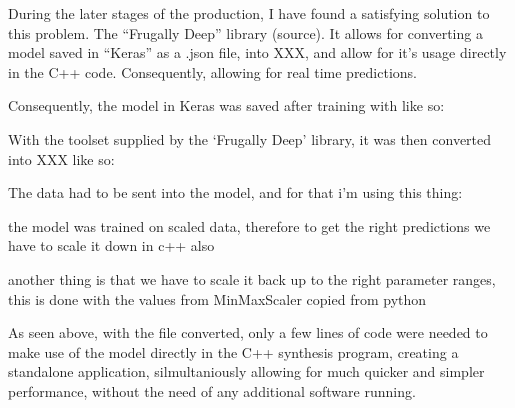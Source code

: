 During the later stages of the production, I have found a satisfying
solution to this problem. The ``Frugally Deep'' library (source). It
allows for converting a model saved in ``Keras'' as a .json file, into
XXX, and allow for it's usage directly in the C++ code. Consequently,
allowing for real time predictions.

Consequently, the model in Keras was saved after training with like so:

With the toolset supplied by the `Frugally Deep' library, it was then
converted into XXX like so:

The data had to be sent into the model, and for that i'm using this thing:

the model was trained on scaled data, therefore to get the right
predictions we have to scale it down in c++ also

another thing is that we have to scale it back up to the right
parameter ranges, this is done with the values from MinMaxScaler
copied from python

As seen above, with the file converted, only a few lines of code were
needed to make use of the model directly in the C++ synthesis program,
creating a standalone application, silmultaniously allowing for much
quicker and simpler performance, without the need of any additional
software running.


%
%
%
%



